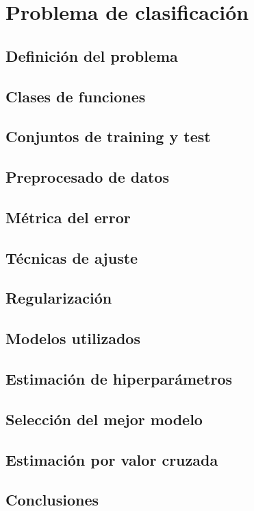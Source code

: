 \chapter{Problema de clasificación}
\section{Definición del problema}
\section{Clases de funciones}
\section{Conjuntos de training y test}
\section{Preprocesado de datos}
\section{Métrica del error}
\section{Técnicas de ajuste}
\section{Regularización}
\section{Modelos utilizados}
\section{Estimación de hiperparámetros}
\section{Selección del mejor modelo}
\section{Estimación por valor cruzada}
\section{Conclusiones}

